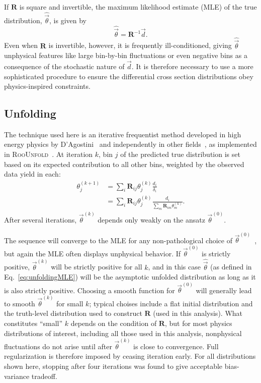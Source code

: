 If $\mathbf{R}$ is square and invertible, the maximum likelihood estimate (MLE) of the true distribution, $\hat{\vec{\theta}}$, is given by
\begin{equation}\label{eq:unfoldingMLE}
  \hat{\vec{\theta}} = \mathbf{R}^{-1}\vec{d}.
\end{equation}
Even when $\mathbf{R}$ is invertible, however, it is frequently ill-conditioned, giving $\hat\vec\theta$ unphysical features like large bin-by-bin fluctuations or even negative bins as a consequence of the stochastic nature of $\vec{d}$.
It is therefore necessary to use a more sophisticated procedure to ensure the differential cross section distributions obey physics-inspired constraints.

\subsection{Unfolding}

The technique used here is an iterative frequentist method developed in high energy physics by D'Agostini~\cite{DAgostini:1994fjx} and independently in other fields~\cite{Dempster:10.2307/2984875,Lucy:1974AJ,Richardson:72,Shepp:4307558}, as implemented in \textsc{RooUnfold}~\cite{Adye:2011gm}.
At iteration $k$, bin $j$ of the predicted true distribution is set based on its expected contribution to all other bins, weighted by the observed data yield in each:
\begin{equation}
  \begin{split}
    \theta_j^{(k+1)} & = \sum_i \mathbf{R}_{ij} \theta_j^{(k)} \frac{d_i}{\delta_i} \\
    & = \sum_i \mathbf{R}_{ij} \theta_j^{(k)} \frac{d_i}{\sum_m \mathbf{R}_{im} \theta_m^{(k)}}.
  \end{split}
\end{equation}
After several iterations, $\vec{\theta}^{(k)}$ depends only weakly on the ansatz $\vec{\theta}^{(0)}$.

The sequence will converge to the MLE for any non-pathological choice of $\vec{\theta}^{(0)}$~\cite{vardi1985}, but again the MLE often displays unphysical behavior.
If $\vec{\theta}^{(0)}$ is strictly positive, $\vec{\theta}^{(k)}$ will be strictly positive for all $k$, and in this case $\hat{\vec{\theta}}$ (as defined in Eq.~\ref{eq:unfoldingMLE}) will be the asymptotic unfolded distribution as long as it is also strictly positive.
Choosing a smooth function for $\vec{\theta}^{(0)}$ will generally lead to smooth $\vec{\theta}^{(k)}$ for small $k$; typical choises include a flat initial distribution and the truth-level distribution used to construct $\mathbf{R}$ (used in this analysis).
What constitutes ``small'' $k$ depends on the condition of $\mathbf{R}$, but for most physics distributions of interest, including all those used in this analysis, nonphysical fluctuations do not arise until after $\vec{\theta}^{(k)}$ is close to convergence.
Full regularization is therefore imposed by ceasing iteration early.
For all distributions shown here, stopping after four iterations was found to give acceptable bias-variance tradeoff.

